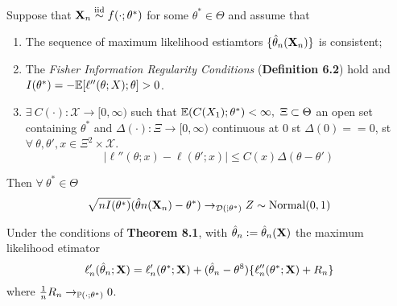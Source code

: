 \documentclass[11pt,a4paper]{article}
\begin{document}
\theorem{}
Suppose that $\textbf{X}_n\overset{\text{iid}}{\sim} f(\cdot;\theta^*)$ for some $\theta^*\in\Theta$ and assume that
\begin{enumerate}[label=\roman*)]
	\item The sequence of maximum likelihood estiamtors $\{\hat{\theta}_n(\textbf{X}_n)\}$ is consistent;
	\item The \textit{Fisher Information Regularity Conditions} (\textbf{Definition 6.2}) hold and $I(\theta^*)=-\mathbb{E}[\ell''(\theta;X);\theta]>0$.
	\item $\exists\ C(\cdot):\mathcal{X}\to[0,\infty)$ such that $\expect(C(X_1);\theta^*)<\infty,\ \Xi\subset\Theta$ an open set containing $\theta^*$ and $\Delta(\cdot):\Xi\to[0,\infty)$ continuous at 0 st $\Delta(0)==0$, st $\forall\ \theta,\theta',x\in\Xi^2\times\mathcal{X}$.
	$$|\ell''(\theta;x)-\ell(\theta';x)|\leq C(x)\Delta(\theta-\theta')$$
\end{enumerate}
Then $\forall\ \theta^*\in\Theta$
$$\sqrt{nI(\theta^*)}(\hat{\theta}n(\textbf{X}_n)-\theta^*)\to_{\mathcal{D}(\dot;\theta^*)}Z\sim\text{Normal}(0,1)$$

\theorem{}
Under the conditions of \textbf{Theorem 8.1}, with $\hat{\theta}_n:=\hat{\theta}_n(\textbf{X})$ the maximum likelihood etimator
$$\ell'_n(\hat{\theta}_n;\textbf{X})=\ell'_n(\theta^*;\textbf{X})+(\hat{\theta}_n-\theta^8)\{\ell''_n(\theta^*;\textbf{X})+R_n\}$$
where $\frac{1}{n}R_n\to_{\mathbb{P}(\cdot;\theta^*)}0$.\\
\end{document}
